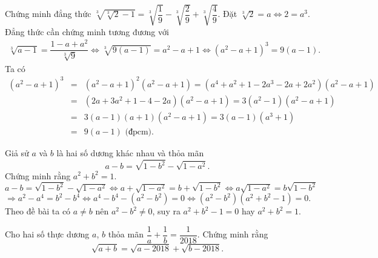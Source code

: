 \begin{bt}%
	Chứng minh đẳng thức $\sqrt[3]{\sqrt[3]{2}-1}=\sqrt[3]{\dfrac{1}{9}}-\sqrt[3]{\dfrac{2}{9}}+\sqrt[3]{\dfrac{4}{9}}$.
	\loigiai
	{
		Đặt $\sqrt[3]{2}=a\Leftrightarrow 2=a^3$.\\
		Đẳng thức cần chứng minh tương đương với
		\begin{eqnarray*}
			\sqrt[3]{a-1}=\dfrac{1-a+a^2}{\sqrt[3]{9}} \Leftrightarrow \sqrt[3]{9(a-1)}=a^2-a+1\Leftrightarrow (a^2-a+1)^3=9(a-1).
		\end{eqnarray*}
		Ta có
		\allowdisplaybreaks
		\begin{eqnarray*}
			(a^2-a+1)^3 &=& (a^2-a+1)^2(a^2-a+1) = (a^4+a^2+1-2a^3-2a+2a^2)(a^2-a+1) \\
			&=& (2a+3a^2+1-4-2a)(a^2-a+1)=3(a^2-1)(a^2-a+1)\\
			&=& 3(a-1)(a+1)(a^2-a+1)=3(a-1)(a^3+1)\\
			&=& 9(a-1) \text{ (đpcm)}.
		\end{eqnarray*}
	}
\end{bt}

\begin{bt}%
	Giả sử $a$ và $b$ là hai số dương khác nhau và thỏa mãn $$a-b=\sqrt{1-b^2}-\sqrt{1-a^2}.$$ Chứng minh rằng $a^2+b^2=1$.
	\loigiai
	{
		$a-b=\sqrt{1-b^2}-\sqrt{1-a^2} \Leftrightarrow a+ \sqrt{1-a^2} = b + \sqrt{1-b^2} \Leftrightarrow a\sqrt{1-a^2} = b\sqrt{1-b^2}$\\
		$\Rightarrow a^2 - a^4 = b^2 - b^4 \Leftrightarrow a^4 - b^4 - (a^2 - b^2) = 0 \Leftrightarrow (a^2 - b^2) (a^2 + b^2 - 1) = 0.$\\
		Theo đề bài ta có $a\ne b$ nên $a^2 - b^2 \ne 0$, suy ra $a^2 + b^2 - 1 = 0$ hay $a^2 + b^2 = 1$.
	}
\end{bt}

\begin{bt}%
	Cho hai số thực dương  $a$, $b$ thỏa mãn $\dfrac{1}{a} + \dfrac{1}{b} = \dfrac{1}{2018}$. Chứng minh rằng 
	$$\sqrt{a + b} = \sqrt{a - 2018} + \sqrt{b - 2018}.$$
\end{bt}	
